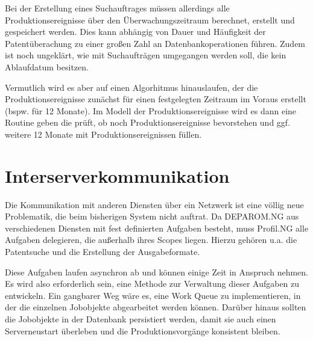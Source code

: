 Bei der Erstellung eines Suchauftrages müssen allerdings alle
Produktionsereignisse über den Überwachungszeitraum berechnet, erstellt und
gespeichert werden. Dies kann abhängig von Dauer und Häufigkeit der
Patentüberachung zu einer großen Zahl an Datenbankoperationen führen. Zudem ist
noch ungeklärt, wie mit Suchaufträgen umgegangen werden soll, die kein
Ablaufdatum besitzen.

Vermutlich wird es aber auf einen Algorhitmus hinauslaufen, der die
Produktionsereignisse zunächst für einen festgelegten Zeitraum im Voraus
erstellt (bspw. für 12 Monate). Im Modell der Produktionsereignisse wird es dann
eine Routine geben die prüft, ob noch Produktionsereignisse bevorstehen und ggf.
weitere 12 Monate mit Produktionsereignissen füllen.

\section{Interserverkommunikation}
\label{ch:Lösungsansatze:Interserverkommunikation}

Die Kommunikation mit anderen Diensten über ein Netzwerk ist eine völlig neue
Problematik, die beim bisherigen System nicht auftrat. Da DEPAROM.NG aus
verschiedenen Diensten mit fest definierten Aufgaben besteht, muss Profil.NG
alle Aufgaben delegieren, die außerhalb ihres Scopes liegen. Hierzu gehören u.a.
die Patentsuche und die Erstellung der Ausgabeformate.

Diese Aufgaben laufen asynchron ab und können einige Zeit in Anspruch nehmen. Es
wird also erforderlich sein, eine Methode zur Verwaltung dieser Aufgaben zu
entwickeln. Ein gangbarer Weg wäre es, eine Work Queue zu implementieren, in
der die einzelnen Jobobjekte abgearbeitet werden können. Darüber hinaus sollten
die Jobobjekte in der Datenbank persistiert werden, damit sie auch einen
Serverneustart überleben und die Produktionsvorgänge konsistent bleiben.
